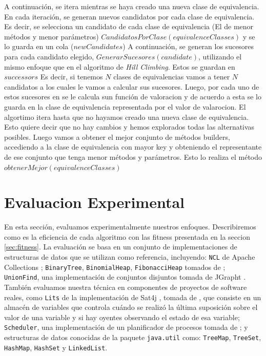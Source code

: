 A continuación, se itera mientras se haya creado una nueva clase de equivalencia. En cada iteración, se generan nuevos candidatos por cada clase de equivalencia. Es decir, se selecciona un candidato de cada clase de equivalencia (El de menor métodos y menor parámetros) $CandidatosPorClase(equivalenceClasses)$ y se lo guarda en un cola ($newCandidates$) A continuación, se generan los sucesores para cada candidato elegido, $GenerarSucesores(candidate)$, utilizando el mismo enfoque que en el algoritmo de \emph{Hill Climbing}. Estos se guardan en $successors$ Es decir, si tenemos $N$ clases de equivalencias vamos a tener $N$ candidatos a los cuales le vamos a calcular sus sucesores.  Luego, por cada uno de estos sucesores en  se le calcula sun función de valoracion y de acuerdo a esta se lo guarda en la clase de equivalencia representada por el valor de valarocion.
El algortimo itera hasta que no hayamos creado una nueva clase de equivalencia. Esto quiere decir que no hay cambios y hemos explorados todas las alternativas posibles. 
Luego vamos a obtener el mejor conjunto de métodos builders, accediendo a la clase de equivalencia con mayor key y obteniendo el representante de ese conjunto que tenga menor métodos y parámetros. Esto lo realiza el método $obtenerMejor(equivalenceClasses)$

\section{Evaluacion Experimental}
En esta sección, evaluamos experimentalmente nuestros enfoques. Describiremos como es la eficiencia de cada algoritmo con las fitness
presentada en la seccion \ref{sec:fitness}.
La evaluación se basa en un conjunto de implementaciones de estructuras de datos que se utilizan como referencia, incluyendo: \verb"NCL" de Apache Collections \cite{apache}; \verb"BinaryTree", \verb"BinomialHeap", \verb"FibonacciHeap" tomados de \cite{Visser:2006}; \verb"UnionFind", una implementación de conjuntos disjuntos tomada de JGrapht \cite{jgrapht}. También evaluamos nuestra técnica en componentes de proyectos de software reales, como \verb"Lits" de la implementación de Sat4j \cite{sat4j}, tomada de \cite{Loncaric:2018}, que consiste en un almacén de variables que controla cuándo se realizó la última suposición sobre el valor de una variable y si hay oyentes observando el estado de esa variable; \verb"Scheduler", una implementación de un planificador de procesos tomada de \cite{sir}; y estructuras de datos conocidas de la paquete \verb"java.util" como: \verb"TreeMap", \verb"TreeSet", \verb"HashMap", \verb"HashSet" y \verb"LinkedList". 
    
